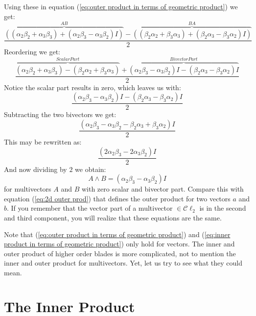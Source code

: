 \documentclass[10pt]{report}
\begin{document}
Using these in equation (\ref{eq:outer product in terms of
geometric product}) we get:
\begin{displaymath}
    \frac{  \overbrace{((\alpha_2 \beta_2 + \alpha_3 \beta_3) + (\alpha_2 \beta_3 - \alpha_3 \beta_2) I)}^{AB}
          - \overbrace{((\beta_2 \alpha_2 + \beta_3 \alpha_3) + (\beta_2 \alpha_3 - \beta_3 \alpha_2) I)}^{BA}}{2}
\end{displaymath}
Reordering we get:
\begin{displaymath}
    \frac{  \overbrace{(\alpha_2 \beta_2 + \alpha_3 \beta_3) -    (\beta_2 \alpha_2 + \beta_3 \alpha_3)  }^{Scalar Part}
          + \overbrace{(\alpha_2 \beta_3 - \alpha_3 \beta_2) I - (\beta_2 \alpha_3 - \beta_3 \alpha_2) I}^{Bivector Part}}{2}
\end{displaymath}
Notice the scalar part results in zero, which leaves us with:
\begin{displaymath}
    \frac{(\alpha_2 \beta_3 - \alpha_3 \beta_2) I - (\beta_2 \alpha_3 - \beta_3 \alpha_2) I}{2}
\end{displaymath}
Subtracting the two bivectors we get:
\begin{displaymath}
    \frac{(\alpha_2 \beta_3 - \alpha_3 \beta_2 - \beta_2 \alpha_3 + \beta_3 \alpha_2) I}{2}
\end{displaymath}
This may be rewritten as:
\begin{displaymath}
    \frac{(2\alpha_2\beta_3 - 2\alpha_3\beta_2) I}{2}
\end{displaymath}
And now dividing by $2$ we obtain:
\begin{displaymath}
    A\wedge B = (\alpha_2\beta_3 - \alpha_3\beta_2)I
\end{displaymath}
for multivectors $A$ and $B$ with zero scalar and bivector part.
Compare this with equation (\ref{eq:2d outer prod}) that defines
the outer product for two vectors $a$ and $b$. If you remember
that the vector part of a multivector $\in \mathcal{C}\ell_2$ is
in the second and third component, you will realize that these
equations are the same.

Note that (\ref{eq:outer product in terms of geometric product})
and (\ref{eq:inner product in terms of geometric product}) only
hold for vectors. The inner and outer product of higher order
blades is more complicated, not to mention the inner and outer
product for multivectors. Yet, let us try to see what they could
mean.

\section{The Inner Product}
\end{document}
